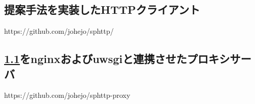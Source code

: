 \documentclass[a4j,12pt]{gradthesis_utf8}
\begin{document}
\begin{appendix}
	\chapter{}\label{appendix}
	\section{提案手法を実装したHTTPクライアント}
	\label{github}
	https://github.com/johejo/sphttp/
	\section{\ref{github}をnginxおよびuwsgiと連携させたプロキシサーバ}
	https://github.com/johejo/sphttp-proxy
	\newpage
\end{appendix}
\end{document}
